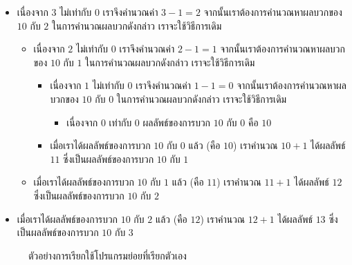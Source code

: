 \begin{itemize}
\item เนื่องจาก $3$ ไม่{\wbr}เท่า{\wbr}กับ $0$ เรา{\wbr}จึง{\wbr}คำนวณ{\wbr}ค่า $3-1 = 2$ จากนั้น{\wbr}เรา{\wbr}ต้องการ{\wbr}คำนวณ{\wbr}หา{\wbr}ผลบวก{\wbr}ของ $10$ กับ $2$ ใน{\wbr}การ{\wbr}คำนวณ{\wbr}ผลบวก{\wbr}ดังกล่าว เรา{\wbr}จะ{\wbr}ใช้{\wbr}วิธีการ{\wbr}เดิม{\wbr}
\begin{itemize}
\item เนื่องจาก $2$ ไม่{\wbr}เท่า{\wbr}กับ $0$ เรา{\wbr}จึง{\wbr}คำนวณ{\wbr}ค่า $2-1 = 1$ จากนั้น{\wbr}เรา{\wbr}ต้องการ{\wbr}คำนวณ{\wbr}หา{\wbr}ผลบวก{\wbr}ของ $10$ กับ $1$ ใน{\wbr}การ{\wbr}คำนวณ{\wbr}ผลบวก{\wbr}ดังกล่าว เรา{\wbr}จะ{\wbr}ใช้{\wbr}วิธีการ{\wbr}เดิม{\wbr}
\begin{itemize}
\item เนื่องจาก $1$ ไม่{\wbr}เท่า{\wbr}กับ $0$ เรา{\wbr}จึง{\wbr}คำนวณ{\wbr}ค่า $1-1 = 0$ จากนั้น{\wbr}เรา{\wbr}ต้องการ{\wbr}คำนวณ{\wbr}หา{\wbr}ผลบวก{\wbr}ของ $10$ กับ $0$ ใน{\wbr}การ{\wbr}คำนวณ{\wbr}ผลบวก{\wbr}ดังกล่าว เรา{\wbr}จะ{\wbr}ใช้{\wbr}วิธีการ{\wbr}เดิม{\wbr}
\begin{itemize}
\item เนื่องจาก $0$ เท่า{\wbr}กับ $0$ ผลลัพธ์{\wbr}ของ{\wbr}การ{\wbr}บวก $10$ กับ $0$ คือ $10$
\end{itemize}
\item เมื่อ{\wbr}เรา{\wbr}ได้{\wbr}ผลลัพธ์{\wbr}ของ{\wbr}การ{\wbr}บวก $10$ กับ $0$ แล้ว (คือ $10$) เรา{\wbr}คำนวณ $10+1$ ได้{\wbr}ผลลัพธ์ $11$ ซึ่ง{\wbr}เป็น{\wbr}ผลลัพธ์{\wbr}ของ{\wbr}การ{\wbr}บวก $10$ กับ $1$
\end{itemize}
\item เมื่อ{\wbr}เรา{\wbr}ได้{\wbr}ผลลัพธ์{\wbr}ของ{\wbr}การ{\wbr}บวก $10$ กับ $1$ แล้ว (คือ $11$) เรา{\wbr}คำนวณ $11+1$ ได้{\wbr}ผลลัพธ์ $12$ ซึ่ง{\wbr}เป็น{\wbr}ผลลัพธ์{\wbr}ของ{\wbr}การ{\wbr}บวก $10$ กับ $2$
\end{itemize}
\item เมื่อ{\wbr}เรา{\wbr}ได้{\wbr}ผลลัพธ์{\wbr}ของ{\wbr}การ{\wbr}บวก $10$ กับ $2$ แล้ว (คือ $12$) เรา{\wbr}คำนวณ $12+1$ ได้{\wbr}ผลลัพธ์ $13$ ซึ่ง{\wbr}เป็น{\wbr}ผลลัพธ์{\wbr}ของ{\wbr}การ{\wbr}บวก $10$ กับ $3$
\end{itemize}


\begin{figure}
\begin{center}
\end{center}
\caption{ตัวอย่าง{\wbr}การ{\wbr}เรียก{\wbr}ใช้{\wbr}โปรแกรมย่อย{\wbr}ที่{\wbr}เรียก{\wbr}ตัวเอง}
\label{rec:add-rec-calls}
\end{figure}



